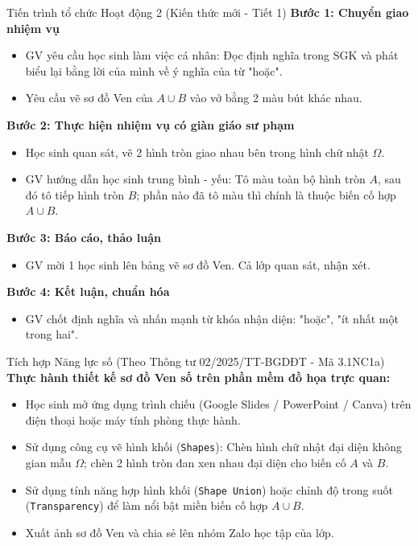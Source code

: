 \documentclass[12pt, a4paper]{article}
\begin{document}
\begin{pedabox}{Tiến trình tổ chức Hoạt động 2 (Kiến thức mới - Tiết 1)}
    \textbf{Bước 1: Chuyển giao nhiệm vụ}
    \begin{itemize}[leftmargin=0.6cm]
        \item GV yêu cầu học sinh làm việc cá nhân: Đọc định nghĩa trong SGK và phát biểu lại bằng lời của mình về ý nghĩa của từ "hoặc".
        \item Yêu cầu vẽ sơ đồ Ven của $A \cup B$ vào vở bằng 2 màu bút khác nhau.
    \end{itemize}

    \textbf{Bước 2: Thực hiện nhiệm vụ có giàn giáo sư phạm}
    \begin{itemize}[leftmargin=0.6cm]
        \item Học sinh quan sát, vẽ 2 hình tròn giao nhau bên trong hình chữ nhật $\Omega$.
        \item GV hướng dẫn học sinh trung bình - yếu: Tô màu toàn bộ hình tròn $A$, sau đó tô tiếp hình tròn $B$; phần nào đã tô màu thì chính là thuộc biến cố hợp $A \cup B$.
    \end{itemize}

    \textbf{Bước 3: Báo cáo, thảo luận}
    \begin{itemize}[leftmargin=0.6cm]
        \item GV mời 1 học sinh lên bảng vẽ sơ đồ Ven. Cả lớp quan sát, nhận xét.
    \end{itemize}

    \textbf{Bước 4: Kết luận, chuẩn hóa}
    \begin{itemize}[leftmargin=0.6cm]
        \item GV chốt định nghĩa và nhấn mạnh từ khóa nhận diện: "hoặc", "ít nhất một trong hai".
    \end{itemize}
\end{pedabox}

\begin{aibox}{Tích hợp Năng lực số (Theo Thông tư 02/2025/TT-BGDĐT - Mã 3.1NC1a)}
    \textbf{Thực hành thiết kế sơ đồ Ven số trên phần mềm đồ họa trực quan:}
    \begin{itemize}[leftmargin=0.6cm]
        \item Học sinh mở ứng dụng trình chiếu (Google Slides / PowerPoint / Canva) trên điện thoại hoặc máy tính phòng thực hành.
        \item Sử dụng công cụ vẽ hình khối (\texttt{Shapes}): Chèn hình chữ nhật đại diện không gian mẫu $\Omega$; chèn 2 hình tròn đan xen nhau đại diện cho biến cố $A$ và $B$.
        \item Sử dụng tính năng hợp hình khối (\texttt{Shape Union}) hoặc chỉnh độ trong suốt (\texttt{Transparency}) để làm nổi bật miền biến cố hợp $A \cup B$.
        \item Xuất ảnh sơ đồ Ven và chia sẻ lên nhóm Zalo học tập của lớp.
    \end{itemize}
\end{aibox}
\end{document}
